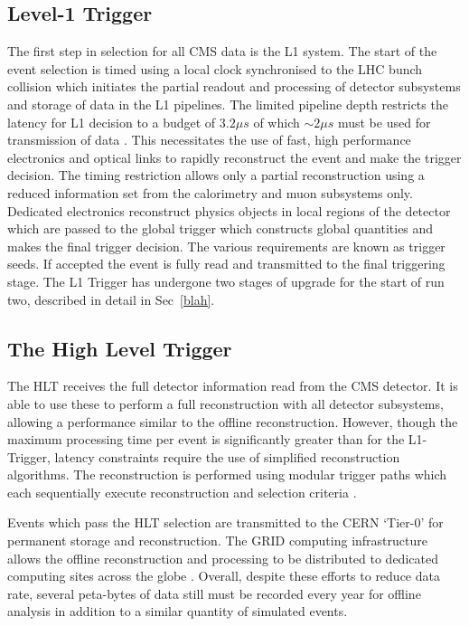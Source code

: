 \subsection{Level-1 Trigger}

The first step in selection for all CMS data is the L1 system. The start of the event selection is timed using a local clock
synchronised to the LHC bunch collision which initiates the partial readout and processing of detector subsystems and storage 
of data in the L1 pipelines. The limited pipeline depth restricts the latency for L1 decision to a budget of $3.2\mu s$
of which $\sim2\mu s$ must be used for transmission of data \cite{daq_performance}. This necessitates the use of fast, high performance electronics
and optical links to rapidly reconstruct the event and make the trigger decision. The timing restriction allows only 
a partial reconstruction using a reduced information set from the calorimetry and muon subsystems only. Dedicated electronics
reconstruct physics objects in local regions of the detector which are passed to the global trigger which constructs global
quantities and makes the final trigger decision. The various requirements are known as trigger seeds. 
If accepted the event is fully read and transmitted to the final triggering
stage. The L1 Trigger has undergone two stages of upgrade for the start of run two, described in detail in Sec~\ref{blah}.

\subsection{The High Level Trigger}

The HLT receives the full detector information read from the CMS detector. It is able to use these to perform 
a full reconstruction with all detector subsystems, allowing a performance similar to the offline reconstruction. However, 
though the maximum processing time per event is significantly greater than for the L1-Trigger, latency constraints 
require the use of simplified reconstruction algorithms. The reconstruction is performed using modular trigger paths
which each sequentially execute reconstruction and selection criteria \cite{daq_performance}. 

Events which pass the HLT selection are transmitted to the CERN `Tier-0' for permanent storage and reconstruction. 
The GRID computing infrastructure allows the offline reconstruction and processing to be distributed to dedicated 
computing sites across the globe \cite{grid_tdr}. Overall, despite these efforts to reduce data rate, 
several peta-bytes of data still must be recorded every year for offline analysis in addition to 
a similar quantity of simulated events.



